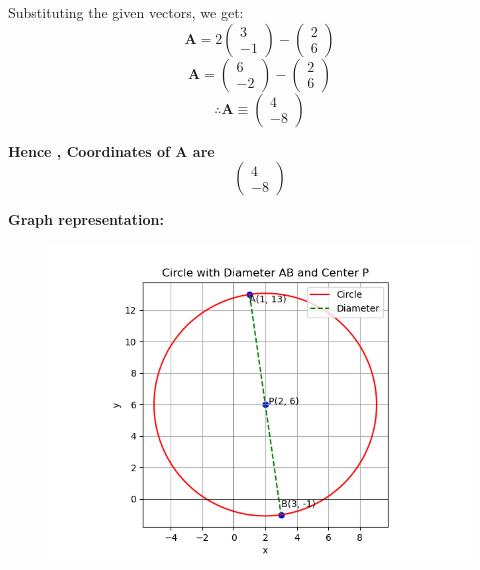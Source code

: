 \documentclass[journal]{IEEEtran}
\numberwithin{equation}{enumi}
\numberwithin{figure}{enumi}
\begin{document}
Substituting the given vectors, we get:
\[
\mathbf{A} = 2 \begin{pmatrix} 3 \\ -1 \end{pmatrix} - \begin{pmatrix} 2 \\ 6 \end{pmatrix} \tag{0.3}
\]
\[
\mathbf{A} = \begin{pmatrix} 6 \\ -2 \end{pmatrix} - \begin{pmatrix} 2 \\ 6 \end{pmatrix} \tag{0.4}
\]
\[
\therefore \mathbf{A} \equiv \begin{pmatrix} 4 \\ -8 \end{pmatrix}
\]

\textbf{Hence , Coordinates of A are } 
\[
\begin{pmatrix} 4 \\ -8 \end{pmatrix}
\]


\textbf{Graph representation:}
\begin{figure}[H]
    \centering
 \includegraphics[width=0.5\linewidth]{figs/fig1.png}
    \caption{}
    \label{fig:placeholder}
\end{figure}
\end{document}
